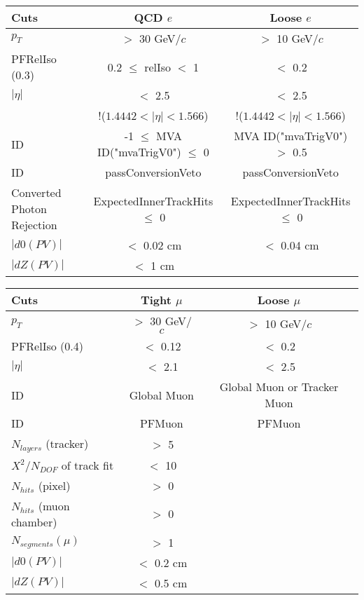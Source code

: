 \documentclass[landscape]{article}
\begin{document}
\begin{small}
\begin{center}
    \vspace{10 mm}

    \begin{tabular}{ | l | c | c | }
      \hline \hline
      Cuts & QCD $e$ & Loose $e$ \\ \hline
      $p_{T}$ & $>$ 30 GeV/$c$ & $>$ 10 GeV/$c$ \\ \hline
      PFRelIso (0.3) & 0.2 $\leq$ relIso $<$ 1 & $<$ 0.2 \\ \hline
      $|\eta|$ & $<$ 2.5 & $<$ 2.5 \\
       & !($1.4442 < |\eta| < 1.566$) & !($1.4442 < |\eta| < 1.566$) \\ \hline
      ID & -1 $\leq$ MVA ID("mvaTrigV0") $\leq$ 0 & MVA ID("mvaTrigV0") $>$ 0.5 \\ \hline
      ID & passConversionVeto & passConversionVeto \\ \hline
      Converted Photon Rejection & ExpectedInnerTrackHits $\leq$ 0 & ExpectedInnerTrackHits $\leq$ 0 \\ \hline
      $|d0(PV)|$ & $<$ 0.02 cm & $<$ 0.04 cm \\ \hline
      $|dZ(PV)|$ & $<$ 1 cm & \\
      \hline \hline
    \end{tabular}

    \vspace{10 mm}

    \begin{tabular}{ | l | c | c | }
      \hline \hline
      Cuts & Tight $\mu$ & Loose $\mu$ \\ \hline
      $p_{T}$ & $>$ 30 GeV/$c$ & $>$ 10 GeV/$c$ \\ \hline
      PFRelIso (0.4) & $<$ 0.12 & $<$ 0.2 \\ \hline
      $|\eta|$ & $<$ 2.1 & $<$ 2.5 \\ \hline
      ID & Global Muon & Global Muon or Tracker Muon \\ \hline
      ID & PFMuon & PFMuon \\ \hline
      $N_{layers}$ (tracker) & $>$ 5 & \\ \hline
      $X^{2} / N_{DOF}$ of track fit & $<$ 10 & \\ \hline
      $N_{hits}$ (pixel) & $>$ 0 & \\ \hline
      $N_{hits}$ (muon chamber) & $>$ 0 & \\ \hline
      $N_{segments}(\mu)$ & $>$ 1 & \\ \hline
      $|d0(PV)|$ & $<$ 0.2 cm & \\ \hline
      $|dZ(PV)|$ & $<$ 0.5 cm & \\
      \hline \hline
    \end{tabular}


\end{center}
\end{small}
\end{document}
